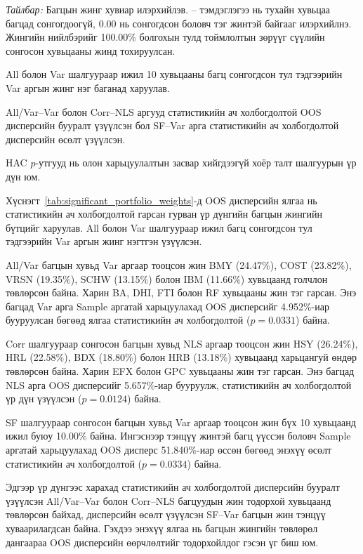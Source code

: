 \begin{table}[htbp]
	\vspace{2mm}
	\begin{minipage}{0.95\linewidth}
		\footnotesize
		\textit{Тайлбар:}
		Багцын жинг хувиар илэрхийлэв.
		-- тэмдэглэгээ нь тухайн хувьцаа багцад
		сонгогдоогүй, 0.00 нь сонгогдсон боловч
		тэг жинтэй байгааг илэрхийлнэ.
		Жингийн нийлбэрийг 100.00\% болгохын тулд
		тоймлолтын зөрүүг сүүлийн сонгосон
		хувьцааны жинд тохируулсан.
		
		All болон Var шалгуураар ижил 10 хувьцааны
		багц сонгогдсон тул тэдгээрийн Var аргын
		жинг нэг баганад харуулав.
		
		All/Var--Var болон Corr--NLS аргууд
		статистикийн ач холбогдолтой OOS дисперсийн
		бууралт үзүүлсэн бол SF--Var арга
		статистикийн ач холбогдолтой дисперсийн
		өсөлт үзүүлсэн.
		
		HAC $p$-утгууд нь олон харьцуулалтын
		засвар хийгдээгүй хоёр талт шалгуурын
		үр дүн юм.
	\end{minipage}
	
\end{table}

Хүснэгт~\ref{tab:significant_portfolio_weights}-д
OOS дисперсийн ялгаа нь статистикийн ач холбогдолтой
гарсан гурван үр дүнгийн багцын жингийн бүтцийг
харуулав. All болон Var шалгуураар ижил багц
сонгогдсон тул тэдгээрийн Var аргын жинг нэгтгэн
үзүүлсэн.

All/Var багцын хувьд Var аргаар тооцсон жин
BMY (24.47\%), COST (23.82\%), VRSN (19.35\%),
SCHW (13.15\%) болон IBM (11.66\%) хувьцаанд
голчлон төвлөрсөн байна. Харин BA, DHI, FTI
болон RF хувьцааны жин тэг гарсан.
Энэ багцад Var арга Sample аргатай харьцуулахад
OOS дисперсийг 4.952\%-иар бууруулсан бөгөөд
ялгаа статистикийн ач холбогдолтой
(\(p=0.0331\)) байна.

Corr шалгуураар сонгосон багцын хувьд
NLS аргаар тооцсон жин HSY (26.24\%),
HRL (22.58\%), BDX (18.80\%) болон
HRB (13.18\%) хувьцаанд харьцангуй
өндөр төвлөрсөн байна.
Харин EFX болон GPC хувьцааны жин тэг гарсан.
Энэ багцад NLS арга OOS дисперсийг
5.657\%-иар бууруулж, статистикийн
ач холбогдолтой үр дүн үзүүлсэн
(\(p=0.0124\)) байна.

SF шалгуураар сонгосон багцын хувьд
Var аргаар тооцсон жин бүх 10 хувьцаанд
ижил буюу 10.00\% байна.
Ингэснээр тэнцүү жинтэй багц үүссэн боловч
Sample аргатай харьцуулахад OOS дисперс
51.840\%-иар өссөн бөгөөд энэхүү өсөлт
статистикийн ач холбогдолтой
(\(p=0.0334\)) байна.

Эдгээр үр дүнгээс харахад статистикийн
ач холбогдолтой дисперсийн бууралт үзүүлсэн
All/Var--Var болон Corr--NLS багцуудын жин
тодорхой хувьцаанд төвлөрсөн байхад,
дисперсийн өсөлт үзүүлсэн SF--Var багцын
жин тэнцүү хуваарилагдсан байна.
Гэхдээ энэхүү ялгаа нь багцын жингийн
төвлөрөл дангаараа OOS дисперсийн
өөрчлөлтийг тодорхойлдог гэсэн үг биш юм.